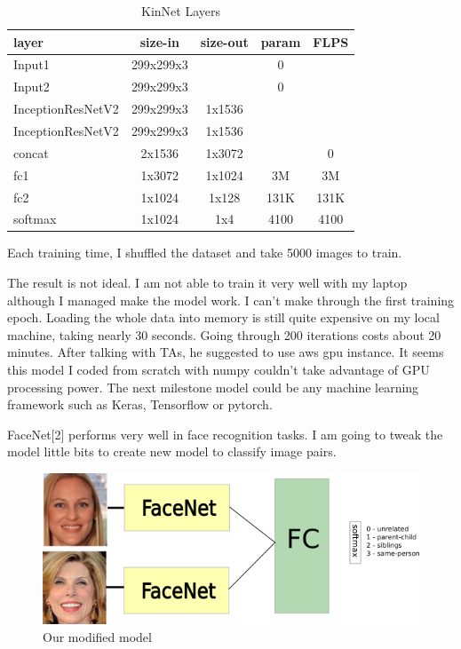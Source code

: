 \documentclass{article}
\begin{document}
\begin{table}[h]
	\centering
	\begin{tabular}{ | l | c | c | c | c |}
		layer&size-in&size-out&param&FLPS\\
		\hline
			Input1 & 299x299x3 & & 0 & \\
			Input2 & 299x299x3 & & 0 & \\
			InceptionResNetV2 & 299x299x3 & 1x1536 & & \\
			InceptionResNetV2 & 299x299x3 & 1x1536 & & \\
			concat & 2x1536 & 1x3072 & & 0 \\
			fc1 & 1x3072 & 1x1024 & 3M & 3M \\
			fc2 & 1x1024 & 1x128 & 131K & 131K \\
			softmax & 1x1024 & 1x4 & 4100 & 4100 \\
		\hline
	\end{tabular}
	\caption{KinNet Layers}
	\label{table:2}
\end{table}

Each training time, I shuffled the dataset and take 5000 images to train.

The result is not ideal. I am not able to train it very well with my laptop
although I managed make the model work. I can't make through the first training
epoch. Loading the whole data into memory is still quite expensive on my local
machine, taking nearly 30 seconds. Going through 200 iterations costs about 20
minutes. After talking with TAs, he suggested to use aws gpu instance. It seems
this model I coded from scratch with numpy couldn't take advantage of GPU
processing power. The next milestone model could be any machine learning
framework such as Keras, Tensorflow or pytorch.

FaceNet[2] performs very well in face recognition tasks. I am going to tweak the
model little bits to create new model to classify image pairs.

\begin{figure}[h]
	\caption{Our modified model}
	\includegraphics[width=1\textwidth]{img/model_pic}
\end{figure}
\end{document}
